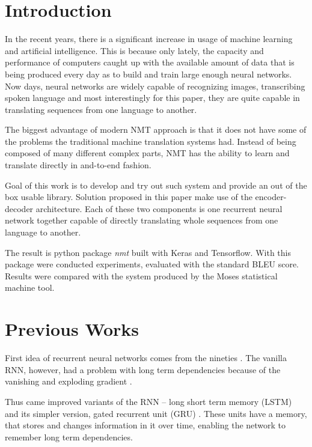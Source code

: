 \documentclass{ExcelAtFIT}
\affiliation{*%
  \href{mailto:xholcn01@stud.fit.vutbr.cz}{xholcn01@stud.fit.vutbr.cz},
  \textit{Faculty of Information Technology, Brno University of Technology}}
\begin{document}
\startdocument


\section{Introduction}
In the recent years, there is a significant increase in usage of machine learning and artificial intelligence. This is because only lately, the capacity and performance of computers caught up with the available amount of data that is being produced every day as to build and train large enough neural networks. Now days, neural networks are widely capable of recognizing images, transcribing spoken language and most interestingly for this paper, they are quite capable in translating sequences from one language to another.

The biggest advantage of modern NMT approach is that it does not have some of the problems the traditional machine translation systems had. Instead of being composed of many different complex parts, NMT has the ability to learn and translate directly in and-to-end fashion.

Goal of this work is to develop and try out such system and provide an out of the box usable library. Solution proposed in this paper make use of the encoder-decoder architecture. Each of these two components is one recurrent neural network together capable of directly translating whole sequences from one language to another.

The result is python package \emph{nmt} built with Keras and Tensorflow. With this package were conducted experiments, evaluated with the standard BLEU score. Results were compared with the system produced by the Moses \cite{Moses} statistical machine tool.


\section{Previous Works}
First idea of recurrent neural networks comes from the nineties \cite{rnn}. The vanilla RNN, however, had a problem with long term dependencies because of the vanishing and exploding gradient \cite{gradientProblems}.

Thus came improved variants of the RNN -- long short term memory (LSTM) \cite{LSTM, forgetLSTM} and its simpler version, gated recurrent unit (GRU) \cite{GRU}. These units have a memory, that stores and changes information in it over time, enabling the network to remember long term dependencies.
\end{document}

